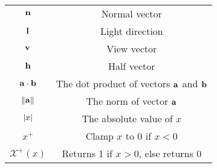 \begin{appendices}
\begin{center}
	\begin{tabular}{ c c }
		\hline
		\begin{math}\mathbf{n}\end{math} & Normal vector \\
		\begin{math}\mathbf{l}\end{math} & Light direction \\
		\begin{math}\mathbf{v}\end{math} & View vector \\
		\begin{math}\mathbf{h}\end{math} & Half vector \\
		\begin{math}\mathbf{a}\cdot\mathbf{b}\end{math} & The dot product of vectors \begin{math}\mathbf{a}\end{math} and \begin{math}\mathbf{b}\end{math} \\
		\begin{math}\norm{\mathbf{a}}\end{math} & The norm of vector \begin{math}\mathbf{a}\end{math} \\
		\begin{math}\abs{x}\end{math} & The absolute value of \begin{math}x\end{math} \\
		\begin{math}x^+\end{math} & Clamp \begin{math}x\end{math} to \begin{math}0\end{math} if \begin{math}x<0\end{math} \\
		\begin{math}\mathcal{X}^+(x)\end{math} & Returns 1 if \begin{math}x > 0\end{math}, else returns 0 \\
		\hline
	\end{tabular}
\end{center}

\end{appendices}
